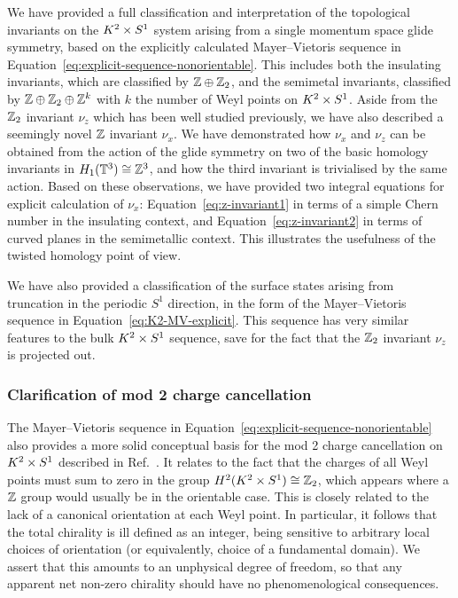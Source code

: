 We have provided a full classification and interpretation of the topological invariants on the $K^2\times S^1$ system arising from a single momentum space glide symmetry, based on the explicitly calculated Mayer--Vietoris sequence in Equation~\eqref{eq:explicit-sequence-nonorientable}. This includes both the insulating invariants, which are classified by $\mathbb{Z}\oplus\mathbb{Z}_2$, and the semimetal invariants, classified by $\mathbb{Z}\oplus\mathbb{Z}_2\oplus\mathbb{Z}^k$ with $k$ the number of Weyl points on $K^2\times S^1$. Aside from the $\mathbb{Z}_2$ invariant $\nu_z$ which has been well studied previously, we have also described a seemingly novel $\mathbb{Z}$ invariant $\nu_x$. We have demonstrated how $\nu_x$ and $\nu_z$ can be obtained from the action of the glide symmetry on two of the basic homology invariants in $H_1(\mathbb{T}^3)\cong\mathbb{Z}^3$, and how the third invariant is trivialised by the same action. Based on these observations, we have provided two integral equations for explicit calculation of $\nu_x$: Equation~\eqref{eq:z-invariant1} in terms of a simple Chern number in the insulating context, and Equation~\eqref{eq:z-invariant2} in terms of curved planes in the semimetallic context. This illustrates the usefulness of the twisted homology point of view.

We have also provided a classification of the surface states arising from truncation in the periodic $S^1$ direction, in the form of the Mayer--Vietoris sequence in Equation~\eqref{eq:K2-MV-explicit}. This sequence has very similar features to the bulk $K^2\times S^1$ sequence, save for the fact that the $\mathbb{Z}_2$ invariant $\nu_z$ is projected out.

\subsubsection{Clarification of mod 2 charge cancellation}

The Mayer--Vietoris sequence in Equation~\eqref{eq:explicit-sequence-nonorientable} also provides a more solid conceptual basis for the mod 2 charge cancellation on $K^2\times S^1$ described in Ref.~\cite{Fonseca-Vaidya_nonorientable}. It relates to the fact that the charges of all Weyl points must sum to zero in the group $H^2(K^2\times S^1)\cong\mathbb{Z}_2$, which appears where a $\mathbb{Z}$ group would usually be in the orientable case. This is closely related to the lack of a canonical orientation at each Weyl point. In particular, it follows that the total chirality is ill defined as an integer, being sensitive to arbitrary local choices of orientation (or equivalently, choice of a fundamental domain). We assert that this amounts to an unphysical degree of freedom, so that any apparent net non-zero chirality should have no phenomenological consequences.

